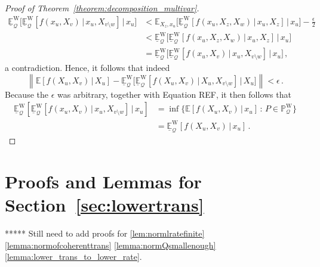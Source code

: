 \documentclass[10pt]{paper}
\theoremstyle{definition}
\newcommand{\processes}{\mathbb{P}}
\newcommand{\wprocesses}{\processes^{\mathrm{W}}}
\newcommand{\rateset}{\mathcal{Q}}
\newcommand{\norm}[1]{\left\lVert #1 \right\rVert}
\begin{document}
\begin{proof}[Proof of Theorem~\ref{theorem:decomposition_multivar}]
\begin{align*}
\underline{\mathbb{E}}^{\mathrm{W}}_\rateset\bigl[\underline{\mathbb{E}}^{\mathrm{W}}_\rateset\left[f(x_u,X_v)\,\vert\,x_u,X_{v\setminus w}\right]\,\vert\,x_u\bigr] &< \mathbb{E}_{X_z,x_u}\bigl[\underline{\mathbb{E}}^{\mathrm{W}}_\rateset\left[f(x_u,X_z,X_w)\,\vert\,x_u,X_z\right] \,\vert\,x_u\bigr] - \frac{\epsilon}{2} \\
 &< \underline{\mathbb{E}}^{\mathrm{W}}_\rateset\bigl[\underline{\mathbb{E}}^{\mathrm{W}}_\rateset\left[f(x_u,X_z,X_w)\,\vert\,x_u,X_z\right] \,\vert\,x_u\bigr] \\
 &= \underline{\mathbb{E}}^{\mathrm{W}}_\rateset\bigl[\underline{\mathbb{E}}^{\mathrm{W}}_\rateset\left[f(x_u,X_v)\,\vert\,x_u,X_{v\setminus w}\right]\,\vert\,x_u\bigr]\,,
\end{align*}
a contradiction. Hence, it follows that indeed
\begin{equation*}
\norm{\mathbb{E}\left[f(X_u,X_v)\,\vert\,X_u\right] - \underline{\mathbb{E}}^{\mathrm{W}}_\rateset\bigl[\underline{\mathbb{E}}^{\mathrm{W}}_\rateset\left[f(X_u,X_v)\,\vert\,X_u,X_{v\setminus w}\right]\,\vert\,X_u\bigr]} < \epsilon\,.
\end{equation*}
Because the $\epsilon$ was arbitrary, together with Equation REF, it then follows that
\begin{align*}
\underline{\mathbb{E}}^{\mathrm{W}}_\rateset[\underline{\mathbb{E}}^{\mathrm{W}}_\rateset [f(x_u,X_v)\,\vert\,x_u,X_{v\setminus w}]\,\vert\,x_u] %
 &= \inf\{\mathbb{E}\left[f(X_u,X_v)\,\vert\,x_u\right]\,:\,P\in\wprocesses_\rateset\} \\
 &= \underline{\mathbb{E}}^{\mathrm{W}}_\rateset\left[f(X_u,X_v)\,\vert\,x_u\right]\,.
\end{align*}
\end{proof}

\section{Proofs and Lemmas for Section~\ref{sec:lowertrans}}

***** Still need to add proofs for \ref{lem:normlratefinite} \ref{lemma:normofcoherenttrans} \ref{lemma:normQsmallenough} \ref{lemma:lower_trans_to_lower_rate}.
\end{document}
